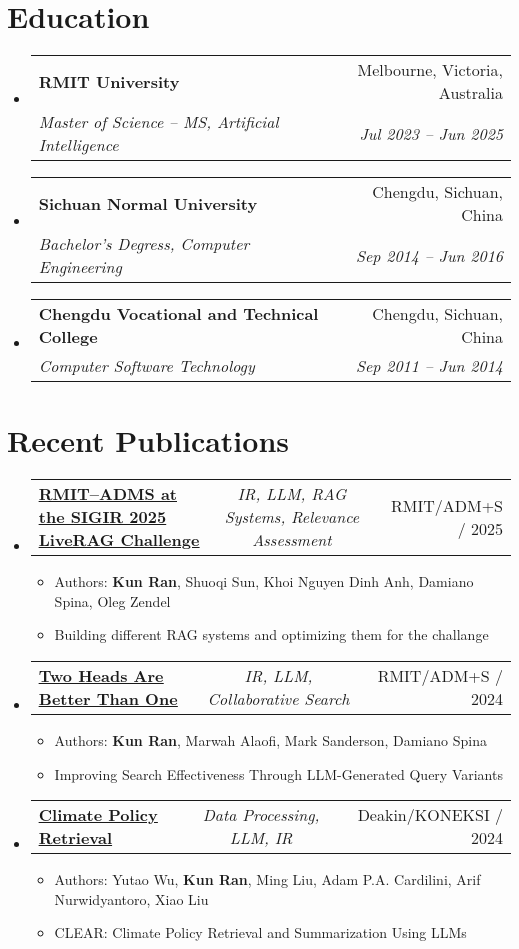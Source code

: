 \documentclass[a4paper,11pt]{article}
\makeatletter
\newcommand{\resumeItem}[1]{
  \item\small{#1}
}
\newcommand{\resumeItemListStart}{\begin{itemize}[rightmargin=0.11in]}
\newcommand{\resumeItemListEnd}{\end{itemize}}
\newcommand{\resumeTrioHeading}[3]{
  \item\small{
    \begin{tabular*}{0.96\textwidth}[t]{
      l@{\extracolsep{\fill}}c@{\extracolsep{\fill}}r
    }
      \textbf{#1} & \textit{#2} & #3
    \end{tabular*}
  }
}
\newcommand{\resumeQuadHeading}[4]{
  \item
  \begin{tabular*}{0.96\textwidth}[t]{l@{\extracolsep{\fill}}r}
    \textbf{#1} & #2 \\
    \textit{\small#3} & \textit{\small #4} \\
  \end{tabular*}
}
\newcommand{\resumeHeadingListStart}{
  \begin{itemize}[leftmargin=0.15in, label={}]
}
\newcommand{\resumeHeadingListEnd}{\end{itemize}}
\makeatother
\begin{document}
\section{Education}
  \resumeHeadingListStart{}
    \resumeQuadHeading{RMIT University}{Melbourne, Victoria, Australia}
    {Master of Science -- MS, Artificial Intelligence}{Jul 2023 -- Jun 2025}
    \resumeQuadHeading{Sichuan Normal University}{Chengdu, Sichuan, China}
    {Bachelor's Degress, Computer Engineering}{Sep 2014 -- Jun 2016}
    \resumeQuadHeading{Chengdu Vocational and Technical College}{Chengdu, Sichuan, China}
    {Computer Software Technology}{Sep 2011 -- Jun 2014}
  \resumeHeadingListEnd{}

\section{Recent Publications}
  \resumeHeadingListStart{}
    \resumeTrioHeading{\href{https://liverag.tii.ae/}{\uline{RMIT–ADMS at the SIGIR 2025 LiveRAG Challenge}}}{IR, LLM, RAG Systems, Relevance Assessment}{RMIT/ADM+S / 2025}
    \resumeItemListStart{}
      \resumeItem{Authors: \textbf{Kun Ran}, Shuoqi Sun, Khoi Nguyen Dinh Anh, Damiano Spina, Oleg Zendel}
      \resumeItem{Building different RAG systems and optimizing them for the challange}
    \resumeItemListEnd{}

    \resumeTrioHeading{\href{https://dl.acm.org/doi/10.1145/3698204.3716468}{\uline{Two Heads Are Better Than One}}}{IR, LLM, Collaborative Search}{RMIT/ADM+S / 2024}
    \resumeItemListStart{}
      \resumeItem{Authors: \textbf{Kun Ran}, Marwah Alaofi, Mark Sanderson, Damiano Spina}
      \resumeItem{Improving Search Effectiveness Through LLM-Generated Query Variants}
    \resumeItemListEnd{}

    \resumeTrioHeading{\href{https://counterinfodemic.org/}{\uline{Climate Policy Retrieval}}}{Data Processing, LLM, IR}{Deakin/KONEKSI / 2024}
    \resumeItemListStart{}
      \resumeItem{Authors: Yutao Wu, \textbf{Kun Ran}, Ming Liu, Adam P.A. Cardilini, Arif Nurwidyantoro, Xiao Liu}
      \resumeItem{CLEAR: Climate Policy Retrieval and Summarization Using LLMs}
    \resumeItemListEnd{}
  \resumeHeadingListEnd{}

\end{document}
